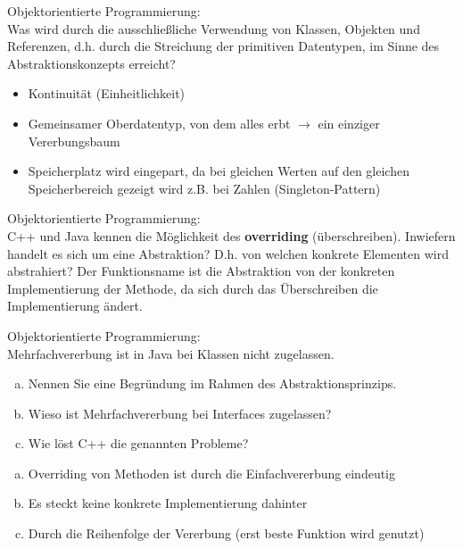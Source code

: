\begin{card}
	Objektorientierte Programmierung:\\
	Was wird durch die ausschließliche Verwendung von Klassen, Objekten und Referenzen, d.h. durch die Streichung der primitiven Datentypen, im Sinne des Abstraktionskonzepts erreicht?
	\hr
	\begin{itemize}
	\item Kontinuität (Einheitlichkeit)
	\item Gemeinsamer Oberdatentyp, von dem alles erbt $\rightarrow$ ein einziger Vererbungsbaum
  \item Speicherplatz wird eingepart, da bei gleichen Werten auf den gleichen Speicherbereich gezeigt wird z.B. bei Zahlen (Singleton-Pattern)
	\end{itemize}
\end{card}

\begin{card}
	Objektorientierte Programmierung:\\
	C++ und Java kennen die Möglichkeit des \textbf{overriding} (überschreiben). Inwiefern handelt es sich um eine Abstraktion? D.h. von welchen konkrete Elementen wird abstrahiert?
	\hr
	Der Funktionsname ist die Abstraktion von der konkreten Implementierung der Methode, da sich durch das Überschreiben die Implementierung ändert.
\end{card}

\begin{card}
	Objektorientierte Programmierung:\\
	Mehrfachvererbung ist in Java bei Klassen nicht zugelassen.
	\begin{enumerate}[a)]
	\item Nennen Sie eine Begründung im Rahmen des Abstraktionsprinzips.
	\item Wieso ist Mehrfachvererbung bei Interfaces zugelassen?
	\item Wie löst C++ die genannten Probleme?
	\end{enumerate}
	\hr
	\begin{enumerate}[a)]
	\item Overriding von Methoden ist durch die Einfachvererbung eindeutig
	\item Es steckt keine konkrete Implementierung dahinter
	\item Durch die Reihenfolge der Vererbung (erst beste Funktion wird genutzt)
	\end{enumerate}
\end{card}

